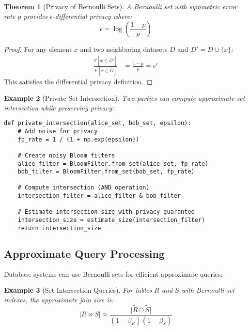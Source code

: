 \documentclass[11pt,final,hidelinks]{article}
\newtheorem{theorem}{Theorem}[section]
\newtheorem{example}[theorem]{Example}
\newcommand{\obs}[1]{\widetilde{#1}}  %
\newcommand{\Prob}[1]{\mathbb{P}\left[#1\right]}
\newcommand{\Card}[1]{\lvert#1\rvert}
\newcommand{\fnrate}{\beta}
\newcommand{\ASet}[1]{\obs{#1}}  %
\begin{document}
\begin{theorem}[Privacy of Bernoulli Sets]
A Bernoulli set with symmetric error rate $p$ provides $\epsilon$-differential privacy where:
\begin{equation}
\epsilon = \log\left(\frac{1-p}{p}\right)
\end{equation}
\end{theorem}

\begin{proof}
For any element $x$ and two neighboring datasets $D$ and $D' = D \cup \{x\}$:
\begin{align}
\frac{\Prob{x \in \ASet{D'}}}{\Prob{x \in \ASet{D}}} &= \frac{1-p}{p} = e^\epsilon
\end{align}
This satisfies the differential privacy definition.
\end{proof}

\begin{example}[Private Set Intersection]
Two parties can compute approximate set intersection while preserving privacy:
\begin{verbatim}
def private_intersection(alice_set, bob_set, epsilon):
    # Add noise for privacy
    fp_rate = 1 / (1 + np.exp(epsilon))
    
    # Create noisy Bloom filters
    alice_filter = BloomFilter.from_set(alice_set, fp_rate)
    bob_filter = BloomFilter.from_set(bob_set, fp_rate)
    
    # Compute intersection (AND operation)
    intersection_filter = alice_filter & bob_filter
    
    # Estimate intersection size with privacy guarantee
    intersection_size = estimate_size(intersection_filter)
    return intersection_size
\end{verbatim}
\end{example}

\subsection{Approximate Query Processing}

Database systems can use Bernoulli sets for efficient approximate queries:

\begin{example}[Set Intersection Queries]
For tables $R$ and $S$ with Bernoulli set indexes, the approximate join size is:
\begin{equation}
\Card{R \bowtie S} \approx \frac{\Card{\ASet{R} \cap \ASet{S}}}{(1-\fnrate_R)(1-\fnrate_S)}
\end{equation}
\end{example}
\end{document}
